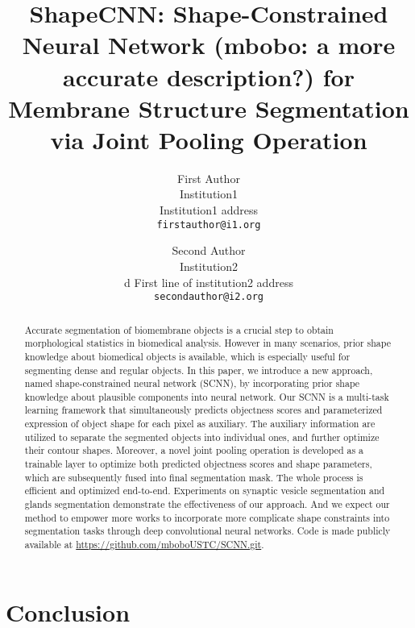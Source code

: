 \documentclass[10pt,twocolumn,letterpaper]{article}
\newcommand{\bobo}[1]{\textcolor[rgb]{0.00,0.30,0.00}{(mbobo: #1)}}
\begin{document}
\title{ShapeCNN: Shape-Constrained Neural Network \bobo{a more accurate description?} for Membrane Structure Segmentation via Joint Pooling Operation}

\author{First Author\\
Institution1\\
Institution1 address\\
{\tt\small firstauthor@i1.org}
\and
Second Author\\
Institution2\\d
First line of institution2 address\\
{\tt\small secondauthor@i2.org}
}



\maketitle


\begin{abstract}
   Accurate segmentation of biomembrane objects is a crucial step to obtain morphological statistics in biomedical analysis.
   However in many scenarios, prior shape knowledge about biomedical objects is available, which is especially useful for segmenting dense and regular objects.
   In this paper, we introduce a new approach, named shape-constrained neural network (SCNN), by incorporating prior shape knowledge about plausible components into neural network.
   Our SCNN is a multi-task learning framework that simultaneously predicts objectness scores and parameterized expression of object shape for each pixel as auxiliary.
   The auxiliary information are utilized to separate the segmented objects into individual ones, and further optimize their contour shapes.
   Moreover, a novel joint pooling operation is developed as a trainable layer to optimize both predicted objectness scores and shape parameters, which are subsequently fused into final segmentation mask.
   The whole process is efficient and optimized end-to-end.
   Experiments on synaptic vesicle segmentation and glands segmentation demonstrate the effectiveness of our approach.
   And we expect our method to empower more works to incorporate more complicate shape constraints into segmentation tasks through deep convolutional neural networks.
   Code is made publicly available at \url{https://github.com/mboboUSTC/SCNN.git}.

\end{abstract}





\section{Conclusion}








{\small


}
\end{document}
